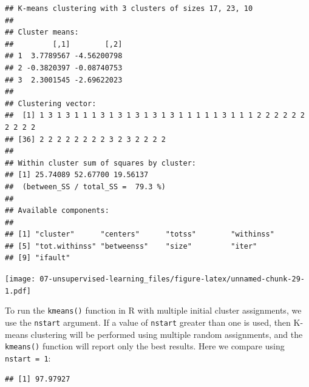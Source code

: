 \documentclass[openany]{book}
\newenvironment{Shaded}{\begin{snugshade}}{\end{snugshade}}
\newcommand{\DataTypeTok}[1]{\textcolor[rgb]{0.13,0.29,0.53}{#1}}
\newcommand{\DecValTok}[1]{\textcolor[rgb]{0.00,0.00,0.81}{#1}}
\newcommand{\KeywordTok}[1]{\textcolor[rgb]{0.13,0.29,0.53}{\textbf{#1}}}
\newcommand{\NormalTok}[1]{#1}
\newcommand{\OperatorTok}[1]{\textcolor[rgb]{0.81,0.36,0.00}{\textbf{#1}}}
\newcommand{\StringTok}[1]{\textcolor[rgb]{0.31,0.60,0.02}{#1}}
\begin{document}
\begin{verbatim}
## K-means clustering with 3 clusters of sizes 17, 23, 10
## 
## Cluster means:
##         [,1]        [,2]
## 1  3.7789567 -4.56200798
## 2 -0.3820397 -0.08740753
## 3  2.3001545 -2.69622023
## 
## Clustering vector:
##  [1] 1 3 1 3 1 1 1 3 1 3 1 3 1 3 1 3 1 1 1 1 1 3 1 1 1 2 2 2 2 2 2 2 2 2 2
## [36] 2 2 2 2 2 2 2 2 3 2 3 2 2 2 2
## 
## Within cluster sum of squares by cluster:
## [1] 25.74089 52.67700 19.56137
##  (between_SS / total_SS =  79.3 %)
## 
## Available components:
## 
## [1] "cluster"      "centers"      "totss"        "withinss"    
## [5] "tot.withinss" "betweenss"    "size"         "iter"        
## [9] "ifault"
\end{verbatim}

\begin{Shaded}
\end{Shaded}

\texttt{[image: 07-unsupervised-learning\_files/figure-latex/unnamed-chunk-29-1.pdf]}

To run the \texttt{kmeans()} function in R with multiple initial cluster assignments,
we use the \texttt{nstart} argument. If a value of \texttt{nstart} greater than one
is used, then K-means clustering will be performed using multiple random
assignments, and the \texttt{kmeans()} function will
report only the best results. Here we compare using \texttt{nstart\ =\ 1}:

\begin{Shaded}
\end{Shaded}

\begin{verbatim}
## [1] 97.97927
\end{verbatim}
\end{document}
